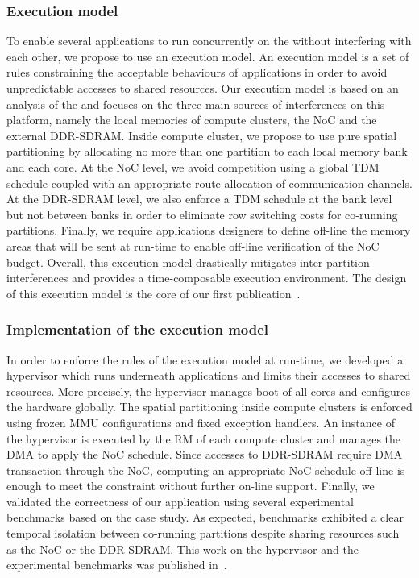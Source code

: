 \documentclass[main.tex]{subfiles}
\begin{document}
\subsubsection{Execution model} To enable several applications to run
concurrently on the \mppalong without interfering with each other, we propose
to use an execution model. An execution model is a set of rules constraining
the acceptable behaviours of applications in order to avoid unpredictable
accesses to shared resources. Our execution model is based on an analysis of
the \mppalong and focuses on the three main sources of interferences on this
platform, namely the local memories of compute clusters, the NoC and the
external DDR-SDRAM. Inside compute cluster, we propose to use pure spatial
partitioning by allocating no more than one partition to each local memory bank
and each core. At the NoC level, we avoid competition using a global TDM
schedule coupled with an appropriate route allocation of communication
channels. At the DDR-SDRAM level, we also enforce a TDM schedule at the bank
level but not between banks in order to eliminate row switching costs for
co-running partitions. Finally, we require applications designers to define
off-line the memory areas that will be sent at run-time to enable off-line
verification of the NoC budget. Overall, this execution model drastically
mitigates inter-partition interferences and provides a time-composable
execution environment. The design of this execution model is the core of our
first publication~\cite{Perret16}.

\subsubsection{Implementation of the execution model} In order to enforce the
rules of the execution model at run-time, we developed a hypervisor which runs
underneath applications and limits their accesses to shared resources. More
precisely, the hypervisor manages boot of all cores and configures the hardware
globally. The spatial partitioning inside compute clusters is enforced using
frozen MMU configurations and fixed exception handlers. An instance of the
hypervisor is executed by the RM of each compute cluster and manages the DMA to
apply the NoC schedule. Since accesses to DDR-SDRAM require DMA transaction
through the NoC, computing an appropriate NoC schedule off-line is enough to
meet the constraint without further on-line support. Finally, we validated the
correctness of our application using several experimental benchmarks based on
the \rosace case study. As expected, benchmarks exhibited a clear temporal
isolation between co-running partitions despite sharing resources such as the
NoC or the DDR-SDRAM. This work on the hypervisor and the experimental
benchmarks was published in~\cite{Perret16_RTAS}.
\end{document}
